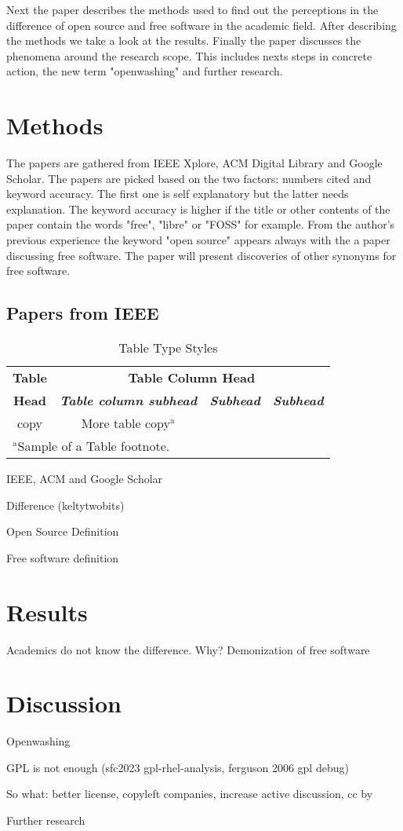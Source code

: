 \documentclass[conference]{IEEEtran}
\begin{document}
Next the paper describes the methods used to find out the perceptions in the difference of open source and free software in the academic field. After describing the methods we take a look at the results. Finally the paper discusses the phenomena around the research scope. This includes nexts steps in concrete action, the new term "openwashing" and further research.

\section{Methods}
The papers are gathered from IEEE Xplore, ACM Digital Library and Google Scholar. The papers are picked based on the two factors: numbers cited and keyword accuracy. The first one is self explanatory but the latter needs explanation. The keyword accuracy is higher if the title or other contents of the paper contain the words "free", "libre" or "FOSS" for example. From the author's previous experience the keyword "open source" appears always with the a paper discussing free software. The paper will present discoveries of other synonyms for free software.  
\subsection{Papers from IEEE}
\begin{table}[htbp]
	\caption{Table Type Styles}
	\begin{center}
		\begin{tabular}{|c|c|c|c|}
			\hline
			\textbf{Table}&\multicolumn{3}{|c|}{\textbf{Table Column Head}} \\
			\cline{2-4} 
			\textbf{Head} & \textbf{\textit{Table column subhead}}& \textbf{\textit{Subhead}}& \textbf{\textit{Subhead}} \\
			\hline
				copy& More table copy$^{\mathrm{a}}$& &  \\
			\hline
			\multicolumn{4}{l}{$^{\mathrm{a}}$Sample of a Table footnote.}
		\end{tabular}
		\label{tab1}
	\end{center}
\end{table}

IEEE, ACM and Google Scholar 

Difference (keltytwobits) 

Open Source Definition

Free software definition

\section{Results}
Academics do not know the difference. Why?
Demonization of free software 

\section{Discussion}
Openwashing 

GPL is not enough (sfc2023 gpl-rhel-analysis, ferguson 2006 gpl debug) 

So what: better license, copyleft companies, increase active discussion, cc by 

Further research 

{}
\end{document}
